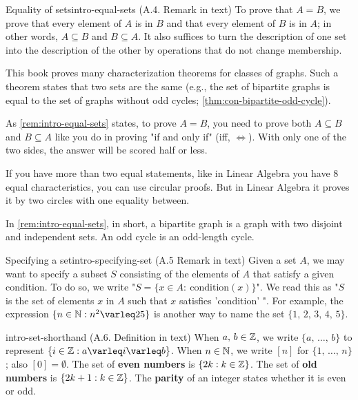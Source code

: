 \documentclass[../src/handouts/main.tex]{subfiles}
\begin{document}

\begin{remark}{Equality of sets}{intro-equal-sets}
  (A.4. Remark in text)
  To prove that $A = B$, we prove that every element of $A$ is in $B$ and that every element of $B$ is in $A$; in other words, $A \subseteq B$ and $B \subseteq A$. It also suffices to turn the description of one set into the description of the other by operations that do not change membership.

  This book proves many characterization theorems for classes of graphs. Such a theorem states that two sets are the same (e.g., the set of bipartite graphs is equal to the set of graphs without odd cycles; \cref{thm:con-bipartite-odd-cycle}).
\end{remark}

As \cref{rem:intro-equal-sets} states, to prove $A = B$, you need to prove both $A \subseteq B$ and $B \subseteq A$ like you do in proving "if and only if" (iff, $\iff$). With only one of the two sides, the answer will be scored half or less.

If you have more than two equal statements, like in Linear Algebra you have 8 equal characteristics, you can use circular proofs. But in Linear Algebra it proves it by two circles with one equality between.

In \cref{rem:intro-equal-sets}, in short, a bipartite graph is a graph with two disjoint and independent sets. An odd cycle is an odd-length cycle.

\begin{remark}{Specifying a set}{intro-specifying-set}
  (A.5 Remark in text)
  Given a set $A$, we may want to specify a subset $S$ consisting of the elements of $A$ that satisfy a given condition. To do so, we write "$S = \{ x \in A:\ \text{condition}(x)\}$". We read this as "$S$ is the set of elements $x$ in $A$ such that $x$ satisfies 'condition' ". For example, the expression $\{ n \in \N : n^2 \leq 25 \}$ is another way to name the set $\{ 1,\, 2,\, 3,\, 4,\, 5 \}$.
\end{remark}

\begin{definition}{}{intro-set-shorthand}
  (A.6. Definition in text)
  When $a,\, b \in \mathbb{Z}$, we write $\{a,\, \ldots,\, b\}$ to represent $\{ i \in \Z: a \leq i \leq b \}$.
  When $n \in \mathbb{N}$, we write $[n]$ for $\{1,\, \ldots,\, n\}$; also $[0] = \emptyset$.
  The set of \textbf{even numbers} is $\{ 2 k : k \in \mathbb{Z} \}$.
  The set of \textbf{old numbers} is $\{ 2 k + 1 : k \in \mathbb{Z} \}$.
  The \textbf{parity} of an integer states whether it is even or odd.
\end{definition}
\end{document}
